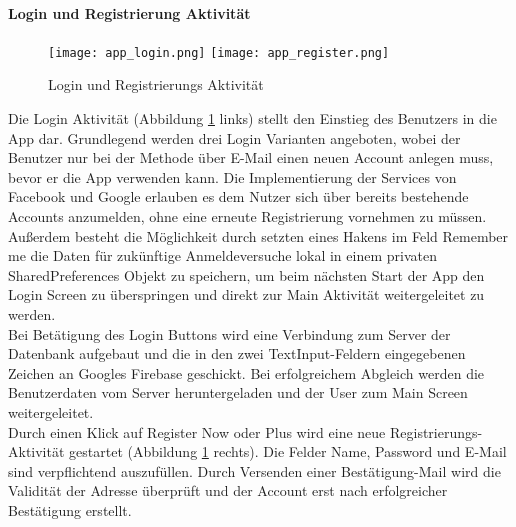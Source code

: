 \paragraph{Login und Registrierung Aktivität}
\begin{figure} [!h]
	\begin{center}
		\texttt{[image: app\_login.png]}
		\hspace{1.5 cm}
		\texttt{[image: app\_register.png]}
	\end{center}
	\caption{Login und Registrierungs Aktivität}
	\label{app_login_reg}
\end{figure}
Die Login Aktivität (Abbildung \ref{app_login_reg} links) stellt den Einstieg des Benutzers in die App dar. Grundlegend werden drei Login Varianten angeboten, wobei der Benutzer nur bei der Methode über E-Mail einen neuen Account anlegen muss, bevor er die App verwenden kann. Die Implementierung der Services von Facebook und Google erlauben es dem Nutzer sich über bereits bestehende Accounts anzumelden, ohne eine erneute Registrierung vornehmen zu müssen. \\
Außerdem besteht die Möglichkeit durch setzten eines Hakens im Feld Remember me die Daten für zukünftige Anmeldeversuche lokal in einem privaten SharedPreferences Objekt zu speichern, um beim nächsten Start der App den Login Screen zu überspringen und direkt zur Main Aktivität weitergeleitet zu werden. \\
Bei Betätigung des Login Buttons wird eine Verbindung zum Server der Datenbank aufgebaut und die in den zwei TextInput-Feldern eingegebenen Zeichen an Googles Firebase geschickt. Bei erfolgreichem Abgleich werden die Benutzerdaten vom Server heruntergeladen und der User zum Main Screen weitergeleitet. \\
Durch einen Klick auf Register Now oder Plus wird eine neue Registrierungs-Aktivität gestartet (Abbildung \ref{app_login_reg} rechts). Die Felder Name, Password und E-Mail sind verpflichtend auszufüllen. Durch Versenden einer Bestätigung-Mail wird die Validität der Adresse überprüft und der Account erst nach erfolgreicher Bestätigung erstellt.

